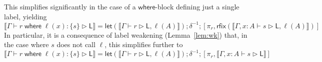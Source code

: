 \documentclass[acmsmall,screen,review]{acmart}
\newcommand{\ms}[1]{\ensuremath{\mathsf{#1}}}
\newcommand{\lto}{:}
\newcommand{\where}[2]{#1\;\ms{where}\;#2}
\newcommand{\wbranch}[3]{#1(#2) \lto \{#3\}}
\newcommand{\bhyp}[2]{#1 : #2}
\newcommand{\haslb}[3]{#1 \vdash #2 \rhd #3}
\newcommand{\dnt}[1]{\llbracket{#1}\rrbracket}
\newcommand{\lmor}[1]{\ms{let}(#1)}
\newcommand{\rfix}[1]{\ms{rfix}(#1)}
\begin{document}
This simplifies significantly in the case of a \ms{where}-block defining just a single label,
yielding
\begin{equation}
  \dnt{\haslb{\Gamma}{\where{r}{\wbranch{\ell}{x}{s}}}{\ms{L}}}
  = \lmor{\dnt{\haslb{\Gamma}{r}{\ms{L}, \ell(A)}}}
  ; \delta^{-1}
  ; [\pi_r, \rfix{\dnt{\haslb{\Gamma, \bhyp{x}{A}}{s}{\ms{L}, \ell(A)}}}]
\end{equation}
In particular, it is a consequence of label weakening (Lemma~\ref{lem:wk}) that, in the case where
$s$ does not call $\ell$, this simplifies further to
\begin{equation}
  \dnt{\haslb{\Gamma}{\where{r}{\wbranch{\ell}{x}{s}}}{\ms{L}}}
  = \lmor{\dnt{\haslb{\Gamma}{r}{\ms{L}, \ell(A)}}}
  ; \delta^{-1}
  ; [\pi_r, \dnt{\haslb{\Gamma, \bhyp{x}{A}}{s}{\ms{L}}}]
\end{equation}
\end{document}
